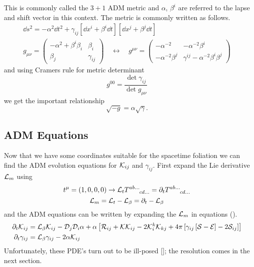 This is commonly called the $3+1$ ADM metric and $\alpha$, $\beta^i$ are referred to the lapse and shift vector in this context. The metric is commonly written as follows.
\begin{gather}\dd s^2 = -\alpha^2 \dd t^2 + \gamma_{ij}\left[\dd x^i + \beta^i \dd t\right]\left[\dd x^j + \beta^j \dd t\right]\\
 g_{\mu\nu} = \begin{pmatrix} -\alpha^2 + \beta^i \beta_i & \beta_i \\ \beta_j & \gamma_{ij} \end{pmatrix}\quad \leftrightarrow\quad g^{\mu\nu} = \begin{pmatrix} -\alpha^{-2}  & -\alpha^{-2} \beta^i \\ -\alpha^{-2}\beta^j & \gamma^{ij} - \alpha^{-2}\beta^i \beta^j \end{pmatrix}\end{gather}
and using Cramers rule for metric determinant
\[ g^{00} = \frac{\det{\gamma_{ij}}}{\det{g_{\mu\nu}}}\]
we get the important relationship
\begin{equation} \sqrt{-g} = \alpha \sqrt{\gamma} .\end{equation}

\subsection{ADM Equations}
Now that we have some coordinates suitable for the spacetime foliation we can find the ADM evolution equations for $\mathcal{K}_{ij}$ and $\gamma_{ij}$. First expand the Lie derivative $\mathcal{L}_m$ using
\[ t^{\mu} = (1,0,0,0) \rightarrow \mathcal{L}_t {{T}}^{ab ...}_{\;\;\;\;\;\;\;cd ...} = \partial_t {{T}}^{ab ...}_{\;\;\;\;\;\;\;cd ...}\]
\[ \mathcal{L}_m = \mathcal{L}_{t} - \mathcal{L}_\beta  = \partial_t - \mathcal{L}_\beta\]
and the ADM equations can be written by expanding the $\mathcal{L}_m$ in equations (). 
\begin{align} \partial_t \mathcal{K}_{ij} &= \mathcal{L}_\beta \mathcal{K}_{ij}  -\mathcal{D}_j\mathcal{D}_i \alpha + \alpha \left[ \mathcal{R}_{ij} + \mathcal{K}\mathcal{K}_{ij} - 2\mathcal{K}^k_i\mathcal{K}_{kj} + 4\pi \left[ \gamma_{ij}\left[ \mathcal{S}-\mathcal{E}\right]-2\mathcal{S}_{ij}\right]\right]\\
\partial_t \gamma_{ij} &= \mathcal{L}_\beta \gamma_{ij} - 2\alpha\mathcal{K}_{ij}\end{align}
Unfortunately, these PDE's turn out to be ill-posed []; the resolution comes in the next section.



